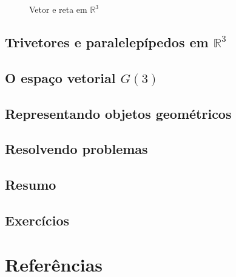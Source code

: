 \documentclass[
  letterpaper,
  DIV=11,
  numbers=noendperiod]{scrreprt}
\newlength{\cslhangindent}
\newlength{\cslentryspacingunit} %
\newenvironment{CSLReferences}[2] %
 {%
  \setlength{\parindent}{0pt}
  \ifodd #1
  \let\oldpar\par
  \def\par{\hangindent=\cslhangindent\oldpar}
  \fi
  \setlength{\parskip}{#2\cslentryspacingunit}
 }%
 {}
\begin{document}
\begin{itemize}
\begin{figure}[htb]
{  }

  \caption{\label{fig-reta-r3}Vetor e reta em $\mathbb{R}^3$}

  \end{figure}
\end{itemize}

\hypertarget{trivetores-e-paralelepuxedpedos-em-mathbbr3}{%
\section{\texorpdfstring{Trivetores e paralelepípedos em
$\mathbb{R}^3$}{Trivetores e paralelepípedos em }}\label{trivetores-e-paralelepuxedpedos-em-mathbbr3}}

\hypertarget{o-espauxe7o-vetorial-g3}{%
\section{\texorpdfstring{O espaço vetorial
$G(3)$}{O espaço vetorial }}\label{o-espauxe7o-vetorial-g3}}

\hypertarget{representando-objetos-geomuxe9tricos}{%
\section{Representando objetos
geométricos}\label{representando-objetos-geomuxe9tricos}}

\hypertarget{resolvendo-problemas}{%
\section{Resolvendo problemas}\label{resolvendo-problemas}}

\hypertarget{resumo}{%
\section{Resumo}\label{resumo}}

\hypertarget{exercuxedcios}{%
\section{Exercícios}\label{exercuxedcios}}

\hypertarget{referuxeancias-1}{%
\chapter*{Referências}\label{referuxeancias-1}}

\hypertarget{refs}{}
\begin{CSLReferences}{0}{0}
\end{CSLReferences}
\end{document}
